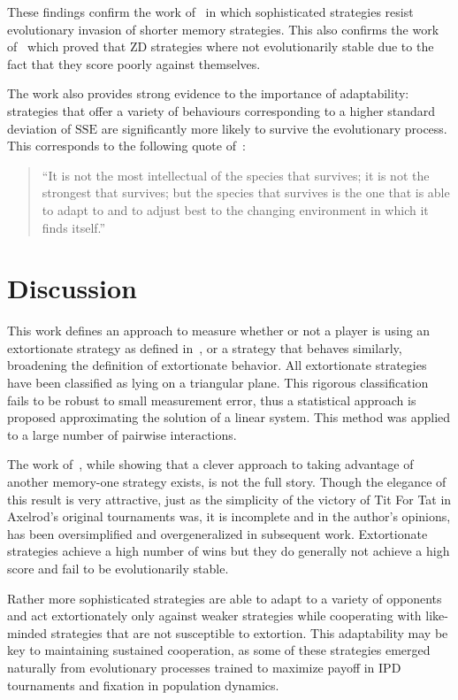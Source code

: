 \documentclass[a4paper]{article}
\newcommand{\SSe}{\text{SSE}}
\begin{document}
These findings confirm the work of~\cite{Moran1707} in which sophisticated
strategies resist evolutionary invasion of shorter memory strategies. This also
confirms the work of~\cite{adami2013evolutionary, hilbe2015partners} which
proved that ZD strategies where not evolutionarily stable due to the fact that
they score poorly against themselves.

The work also provides strong evidence to the importance of adaptability:
strategies that offer a variety of behaviours corresponding to a higher standard
deviation of \(\SSe\) are significantly more likely to survive the
evolutionary process. This corresponds to the following quote
of~\cite{darwin1869origin}:

\begin{quote}
``It is not the most intellectual of the species that survives; it is not the
strongest that survives; but the species that survives is the one that is able
to adapt to and to adjust best to the changing environment in which it finds
itself.''
\end{quote}

\section{Discussion}\label{sec:conclusion}

This work defines an approach to measure whether or not a player is using an
extortionate strategy as defined in~\cite{Press2012}, or a strategy that behaves
similarly, broadening the definition of extortionate behavior. All extortionate
strategies have been classified as lying on a triangular plane. This rigorous
classification fails to be robust to small measurement error, thus a statistical
approach is proposed approximating the solution of a linear system.
This method
was applied to a large number of pairwise interactions.

The work of~\cite{Press2012}, while showing that a clever approach to taking
advantage of another memory-one strategy exists, is not the full story.
Though the elegance of this result is very attractive, just as the simplicity of
the victory of Tit For Tat in Axelrod's original tournaments was, it is
incomplete and in the author's opinions, has been oversimplified and
overgeneralized in subsequent work. Extortionate strategies achieve a high
number of wins but they do generally not achieve a high score and fail to be
evolutionarily stable.

Rather more sophisticated strategies are able to adapt to a variety of opponents
and act extortionately only against weaker strategies while cooperating with
like-minded strategies that are not susceptible to extortion. This adaptability
may be key to maintaining sustained cooperation, as some of these strategies
emerged naturally from evolutionary processes trained to maximize payoff in
IPD tournaments and fixation in population dynamics.
\end{document}
